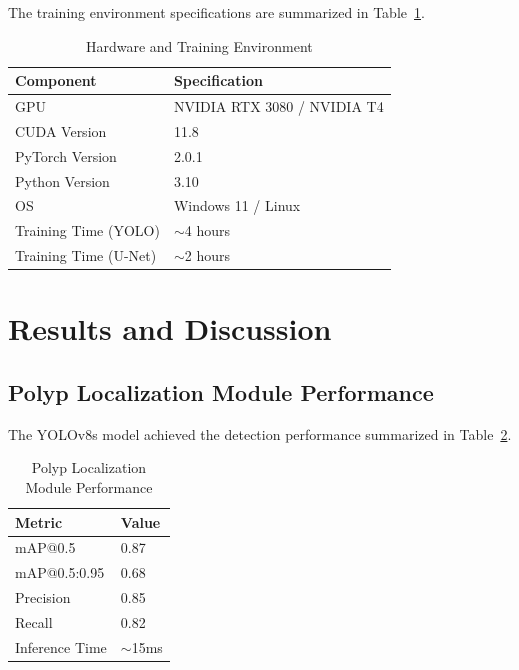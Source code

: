 \documentclass[conference]{IEEEtran}
\begin{document}
The training environment specifications are summarized in Table~\ref{tab:hardware}.

\begin{table}[htbp]
\caption{Hardware and Training Environment}
\label{tab:hardware}
\centering
\begin{tabular}{ll}
\toprule
\textbf{Component} & \textbf{Specification} \\
\midrule
GPU & NVIDIA RTX 3080 / NVIDIA T4 \\
CUDA Version & 11.8 \\
PyTorch Version & 2.0.1 \\
Python Version & 3.10 \\
OS & Windows 11 / Linux \\
Training Time (YOLO) & $\sim$4 hours \\
Training Time (U-Net) & $\sim$2 hours \\
\bottomrule
\end{tabular}
\end{table}

\section{Results and Discussion}

\subsection{Polyp Localization Module Performance}

The YOLOv8s model achieved the detection performance summarized in Table~\ref{tab:plm_results}.

\begin{table}[htbp]
\caption{Polyp Localization Module Performance}
\label{tab:plm_results}
\centering
\begin{tabular}{ll}
\toprule
\textbf{Metric} & \textbf{Value} \\
\midrule
mAP@0.5 & 0.87 \\
mAP@0.5:0.95 & 0.68 \\
Precision & 0.85 \\
Recall & 0.82 \\
Inference Time & $\sim$15ms \\
\bottomrule
\end{tabular}
\end{table}
\end{document}
